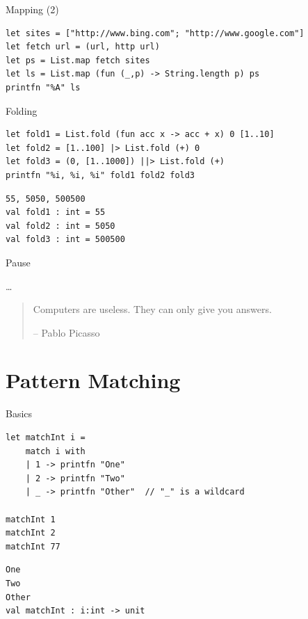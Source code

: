 \documentclass[t]{beamer}
\begin{document}
\begin{frame}[label={sec:org62b83a8},fragile]{Mapping (2)}
 \tiny

\begin{verbatim}
let sites = ["http://www.bing.com"; "http://www.google.com"]
let fetch url = (url, http url)
let ps = List.map fetch sites
let ls = List.map (fun (_,p) -> String.length p) ps
printfn "%A" ls
\end{verbatim}
\end{frame}

\begin{frame}[label={sec:org3b0f73e},fragile]{Folding}
 \begin{verbatim}
let fold1 = List.fold (fun acc x -> acc + x) 0 [1..10]
let fold2 = [1..100] |> List.fold (+) 0
let fold3 = (0, [1..1000]) ||> List.fold (+)
printfn "%i, %i, %i" fold1 fold2 fold3
\end{verbatim}

\begin{verbatim}
55, 5050, 500500
val fold1 : int = 55
val fold2 : int = 5050
val fold3 : int = 500500
\end{verbatim}
\end{frame}

\begin{frame}[label={sec:org5fe184b}]{Pause}
\begin{block}{\ldots{}}
\begin{quote}
Computers are useless. They can only give you answers.

\null\hfill-- Pablo Picasso
\end{quote}
\end{block}
\end{frame}

\section{Pattern Matching }
\label{sec:orgd1971c5}

\begin{frame}[label={sec:orgc6c94e4},fragile]{Basics}
 \begin{verbatim}
let matchInt i =
    match i with
    | 1 -> printfn "One"
    | 2 -> printfn "Two"
    | _ -> printfn "Other"  // "_" is a wildcard

matchInt 1
matchInt 2
matchInt 77
\end{verbatim}

\begin{verbatim}
One
Two
Other
val matchInt : i:int -> unit
\end{verbatim}
\end{frame}
\end{document}

